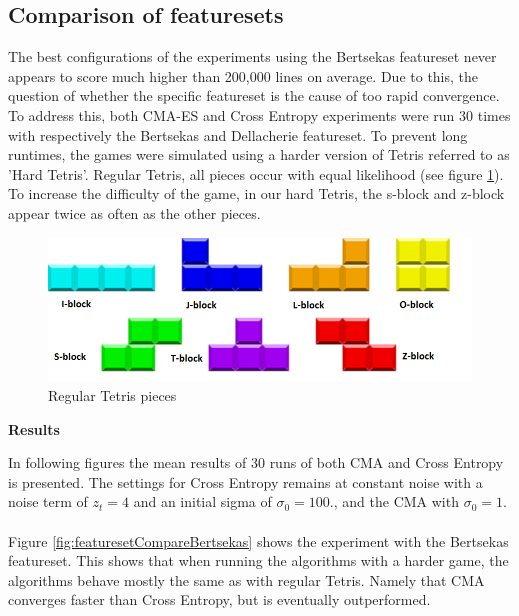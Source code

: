 \subsection{Comparison of featuresets}

The best configurations of the experiments using the Bertsekas
featureset never appears to score much higher than 200,000 lines
on average. Due to this, the question of whether the specific featureset
is the cause of too rapid convergence. To address this, both CMA-ES and Cross
Entropy experiments were run 30 times with respectively the Bertsekas and 
Dellacherie featureset. To prevent long runtimes, the games were simulated
using a harder version of Tetris referred to as 'Hard Tetris'. Regular 
Tetris, all pieces occur with equal likelihood (see figure \ref{fig:TetrisPieces}). To increase the difficulty of the game,
in our hard Tetris, the s-block and z-block appear twice as often 
as the other pieces.

\begin{figure}[H]
\begin{center}
\includegraphics[scale=0.6]{img/Pieces}
\end{center}
\caption{Regular Tetris pieces \label{fig:TetrisPieces}}
\end{figure}



\textbf{Results}

In following figures the mean results of 30 runs of both CMA and Cross 
Entropy is presented. The settings for Cross Entropy remains at constant noise
with a noise term of $z_t = 4$ and an initial sigma of $\sigma_0 = 100.$, 
and the CMA with $\sigma_0 = 1$.\\
\\
Figure \ref{fig:featuresetCompareBertsekas} shows the experiment with the 
Bertsekas featureset. This shows that when running the algorithms with a
harder game, the algorithms behave mostly the same as with regular 
Tetris. Namely that CMA converges faster than Cross Entropy, 
but is eventually outperformed.

